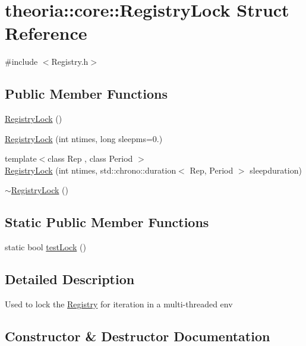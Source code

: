 \hypertarget{structtheoria_1_1core_1_1RegistryLock}{}\section{theoria\+:\+:core\+:\+:Registry\+Lock Struct Reference}
\label{structtheoria_1_1core_1_1RegistryLock}


{\ttfamily \#include $<$Registry.\+h$>$}

\subsection*{Public Member Functions}
\begin{DoxyCompactItemize}
\item 
\hyperlink{structtheoria_1_1core_1_1RegistryLock_af71616cf187018a4cf9da5fb0b7bd3b7}{Registry\+Lock} ()
\item 
\hyperlink{structtheoria_1_1core_1_1RegistryLock_a207ca3d063dd8aa9864a69c8bfc7d37d}{Registry\+Lock} (int ntimes, long sleepms=0.)
\item 
{\footnotesize template$<$class Rep , class Period $>$ }\\\hyperlink{structtheoria_1_1core_1_1RegistryLock_a125ee48beb0368158dc4a38716196d5c}{Registry\+Lock} (int ntimes, std\+::chrono\+::duration$<$ Rep, Period $>$ sleepduration)
\item 
\hyperlink{structtheoria_1_1core_1_1RegistryLock_a374ac63681fd8b4fa891897eeeb75465}{$\sim$\+Registry\+Lock} ()
\end{DoxyCompactItemize}
\subsection*{Static Public Member Functions}
\begin{DoxyCompactItemize}
\item 
static bool \hyperlink{structtheoria_1_1core_1_1RegistryLock_a28e3a44cfa3ef223db18db201e635254}{test\+Lock} ()
\end{DoxyCompactItemize}


\subsection{Detailed Description}
Used to lock the \hyperlink{classtheoria_1_1core_1_1Registry}{Registry} for iteration in a multi-\/threaded env 

\subsection{Constructor \& Destructor Documentation}
\mbox{\label{structtheoria_1_1core_1_1RegistryLock_af71616cf187018a4cf9da5fb0b7bd3b7}} 
